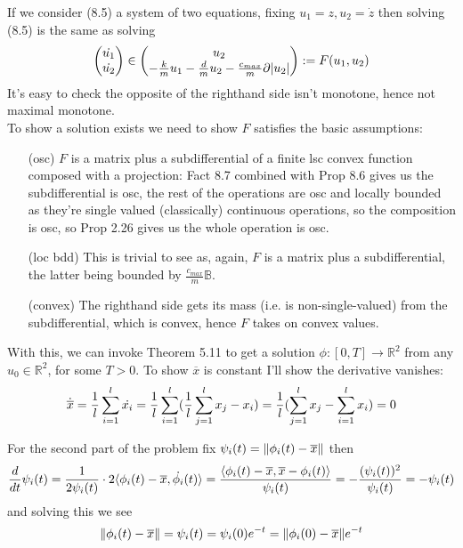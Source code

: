 \documentclass{article}
\newenvironment{ex}[1]
  {\renewcommand\theexercise{#1}\exercise}
  {\endexercise}
\newcommand{\B}{\mathbb{B}}
\newcommand{\R}[1]{\mathbb{R}^{#1}}
\newcommand{\xb}{\overline{x}}
\begin{document}
\begin{ex}{8.16} %
  If we consider (8.5) a system of two equations, fixing $u_1 = z, u_2 = \dot{z}$ then solving (8.5) is the same as solving
  $$
  \begin{pmatrix}
    \dot{u_1} \\
    \dot{u_2}
  \end{pmatrix} \in \begin{pmatrix}
    u_2 \\
    -\frac{k}{m} u_1 - \frac{d}{m} u_2 - \frac{c_{max}}{m} \partial \lvert u_2\rvert
  \end{pmatrix} := F(u_1, u_2)
  $$
  It's easy to check the opposite of the righthand side isn't monotone, hence not maximal monotone. \, \\

  To show a solution exists we need to show $F$ satisfies the basic assumptions:
  \begin{itemize}
    \item[(osc)] $F$ is a matrix plus a subdifferential of a finite lsc convex function composed with a projection: Fact 8.7 combined with Prop 8.6 gives us the subdifferential is osc, the rest of the operations are osc and locally bounded as they're single valued (classically) continuous operations, so the composition is osc, so Prop 2.26 gives us the whole operation is osc.
    \item[(loc bdd)] This is trivial to see as, again, $F$ is a matrix plus a subdifferential, the latter being bounded by $\frac{c_{max}}{m}\B$.
    \item[(convex)] The righthand side gets its mass (i.e. is non-single-valued) from the subdifferential, which is convex, hence $F$ takes on convex values.
  \end{itemize}
  With this, we can invoke Theorem 5.11 to get a solution $\phi : [0, T] \to \R{2}$ from any $u_0 \in \R{2}$, for some $T > 0$.
\end{ex} %
\begin{ex}{8.18} %
  To show $\xb$ is constant I'll show the derivative vanishes:
  $$
  \dot{\xb} = \frac{1}{l} \sum_{i=1}^l \dot{x_i} = \frac{1}{l} \sum_{i=1}^l \parens{ \frac{1}{l} \sum_{j=1}^l x_j - x_i } = \frac{1}{l} \parens{ \sum_{j=1}^l x_j - \sum_{i=1}^l x_i } = 0
  $$

  For the second part of the problem fix $\psi_i(t) = \norm{\phi_i(t) - \xb}$ then
  $$
  \frac{d}{dt} \psi_i(t) = \frac{1}{2 \psi_i(t)} \cdot 2 \iprod{\phi_i(t) - \xb}{\dot{\phi_i}(t)} = \frac{\iprod{\phi_i(t) - \xb}{\xb - \phi_i(t)}}{\psi_i(t)} = - \frac{(\psi_i(t))^2}{\psi_i(t)} = -\psi_i(t)
  $$
  and solving this we see
  $$
  \norm{\phi_i(t) - \xb} = \psi_i(t) = \psi_i(0) e^{-t} = \norm{\phi_i(0) - \xb} e^{-t}
  $$
\end{ex} %
\end{document}
